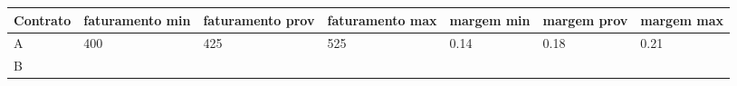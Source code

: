 \documentclass[11pt]{article}
\begin{document}
    \begin{longtable}[]{@{}lllllll@{}}
\toprule
\begin{minipage}[b]{0.04\columnwidth}\raggedright\strut
Contrato\strut
\end{minipage} & \begin{minipage}[b]{0.04\columnwidth}\raggedright\strut
faturamento min\strut
\end{minipage} & \begin{minipage}[b]{0.04\columnwidth}\raggedright\strut
faturamento prov\strut
\end{minipage} & \begin{minipage}[b]{0.04\columnwidth}\raggedright\strut
faturamento max\strut
\end{minipage} & \begin{minipage}[b]{0.04\columnwidth}\raggedright\strut
margem min\strut
\end{minipage} & \begin{minipage}[b]{0.04\columnwidth}\raggedright\strut
margem prov\strut
\end{minipage} & \begin{minipage}[b]{0.04\columnwidth}\raggedright\strut
margem max\strut
\end{minipage}\tabularnewline
\midrule
\endhead
\begin{minipage}[t]{0.04\columnwidth}\raggedright\strut
A\strut
\end{minipage} & \begin{minipage}[t]{0.04\columnwidth}\raggedright\strut
400\strut
\end{minipage} & \begin{minipage}[t]{0.04\columnwidth}\raggedright\strut
425\strut
\end{minipage} & \begin{minipage}[t]{0.04\columnwidth}\raggedright\strut
525\strut
\end{minipage} & \begin{minipage}[t]{0.04\columnwidth}\raggedright\strut
0.14\strut
\end{minipage} & \begin{minipage}[t]{0.04\columnwidth}\raggedright\strut
0.18\strut
\end{minipage} & \begin{minipage}[t]{0.04\columnwidth}\raggedright\strut
0.21\strut
\end{minipage}\tabularnewline
\begin{minipage}[t]{0.04\columnwidth}\raggedright\strut
B\strut
\end{minipage} & \begin{minipage}[t]{0.04\columnwidth}\raggedright\strut

\end{minipage}
\end{longtable}
\end{document}
